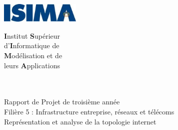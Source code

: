 \begin{titlepage}
	\begin{minipage}{0.5\textwidth}
		\begin{flushleft} \large
			\includegraphics[width=3.8cm]{../images/logo-isima.jpg}\\
		\end{flushleft}
	\end{minipage}
	\begin{minipage}{0.43\textwidth}
		\begin{flushright} \large
		\end{flushright}
	\end{minipage}

	\begin{minipage}{0.5\textwidth}
		\begin{flushleft} \large
			\textbf{I}nstitut \textbf{S}upérieur\\
			d'\textbf{I}nformatique de\\
			\textbf{M}odélisation et de\\
			leurs \textbf{A}pplications\\
			~\\
		\end{flushleft}
	\end{minipage}
	\begin{minipage}{0.43\textwidth}
		\begin{flushright} \large
		\end{flushright}
	\end{minipage}


		\vfill
		\begin{center}
			\Hrule \\[0.4cm]
			\Large{Rapport de Projet de troisième année}\\		
			\Large Filière 5 : Infrastructure entreprise, réseaux et télécoms\\[1.0cm]
			\Huge{Représentation et analyse de la topologie internet}\\
			\Hrule\\[0.8cm]
\vfill 
		\end{center}
		

\end{titlepage}
